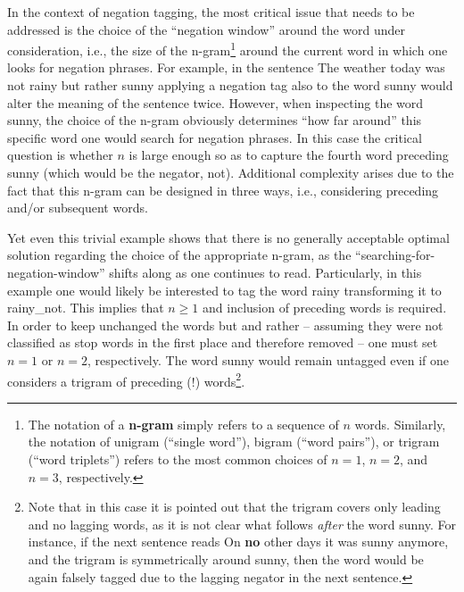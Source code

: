 \begin{enumerate}[(1)]

In the context of negation tagging, the most critical issue that needs to be addressed is the choice of the \enquote{negation window} around the word under consideration, i.e., the size of the n-gram\footnote{The notation of a \textbf{n-gram} simply refers to a sequence of $n$ words. Similarly, the notation of unigram (\enquote{single word}), bigram (\enquote{word pairs}), or trigram (\enquote{word triplets}) refers to the most common choices of $n=1$, $n=2$, and $n=3$, respectively.} around the current word in which one looks for negation phrases. For example, in the sentence \textsf{The weather today was not rainy but rather sunny} applying a negation tag also to the word \textsf{sunny} would alter the meaning of the sentence twice. However, when inspecting the word \textsf{sunny}, the choice of the n-gram obviously determines \enquote{how far around} this specific word one would search for negation phrases. In this case the critical question is whether $n$ is large enough so as to capture the fourth word preceding \textsf{sunny} (which would be the negator, \textsf{not}). Additional complexity arises due to the fact that this n-gram can be designed in three ways, i.e., considering preceding and/or subsequent words. 

Yet even this trivial example shows that there is no generally acceptable optimal solution regarding the choice of the appropriate n-gram, as the \enquote{searching-for-negation-window} shifts along as one continues to read. Particularly, in this example one would likely be interested to tag the word \textsf{rainy} transforming it to \textsf{rainy\_not}. This implies that $n \geq 1$ and inclusion of preceding words is required. In order to keep unchanged the words \textsf{but} and \textsf{rather} -- assuming they were not classified as stop words in the first place and therefore removed -- one must set $n = 1$ or $n=2$, respectively. The word \textsf{sunny} would remain untagged even if one considers a trigram of preceding (!) words\footnote{Note that in this case it is pointed out that the trigram covers only leading and no lagging words, as it is not clear what follows \textit{after} the word \textsf{sunny}. For instance, if the next sentence reads \textsf{On \textbf{no} other days it was sunny anymore}, and the trigram is symmetrically around \textsf{sunny}, then the word would be again falsely tagged due to the lagging negator in the next sentence.}.


\end{enumerate}
